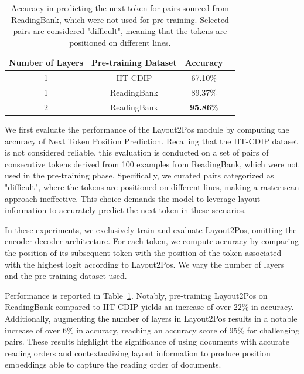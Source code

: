 \begin{table}[H]
  \centering
  \small
  \begin{adjustbox}{max width=\textwidth}
  \begin{threeparttable}
  \begin{tabular}{cccc}
      \toprule
          Number of Layers & Pre-training Dataset & Accuracy \\ 
      \midrule
          1                & IIT-CDIP             & 67.10\%  \\
          1                & ReadingBank          & 89.37\%  \\
          2                & ReadingBank          & \textbf{95.86}\%   \\
      \bottomrule
  \end{tabular}
  \end{threeparttable}
  \end{adjustbox}
  \caption{Accuracy in predicting the next token for pairs sourced from ReadingBank, which were not used for pre-training. Selected pairs are considered "difficult", meaning that the tokens are positioned on different lines.}
  \label{table:next-token-prediction-results}
\end{table}

We first evaluate the performance of the Layout2Pos module by computing the accuracy of Next Token Position Prediction. Recalling that the IIT-CDIP dataset is not considered reliable, this evaluation is conducted on a set of pairs of consecutive tokens derived from 100 examples from ReadingBank, which were not used in the pre-training phase. Specifically, we curated pairs categorized as "difficult", where the tokens are positioned on different lines, making a raster-scan approach ineffective. This choice demands the model to leverage layout information to accurately predict the next token in these scenarios.

In these experiments, we exclusively train and evaluate Layout2Pos, omitting the encoder-decoder architecture. For each token, we compute accuracy by comparing the position of its subsequent token with the position of the token associated with the highest logit according to Layout2Pos. We vary the number of layers and the pre-training dataset used. 

Performance is reported in Table~\ref{table:next-token-prediction-results}. Notably, pre-training Layout2Pos on ReadingBank compared to IIT-CDIP yields an increase of over 22\% in accuracy. Additionally, augmenting the number of layers in Layout2Pos results in a notable increase of over 6\% in accuracy, reaching an accuracy score of 95\% for challenging pairs. These results highlight the significance of using documents with accurate reading orders and contextualizing layout information to produce position embeddings able to capture the reading order of documents.


